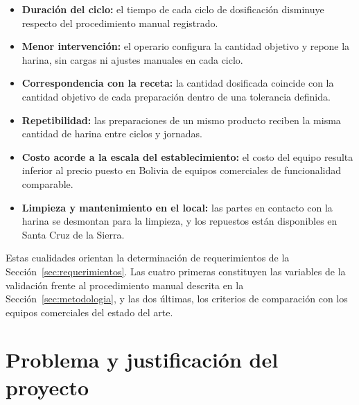 \begin{itemize}
    \item \textbf{Duración del ciclo:} el tiempo de cada ciclo de
    dosificación disminuye respecto del procedimiento manual registrado.
    \item \textbf{Menor intervención:} el operario configura la cantidad
    objetivo y repone la harina, sin cargas ni ajustes manuales en cada
    ciclo.
    \item \textbf{Correspondencia con la receta:} la cantidad dosificada
    coincide con la cantidad objetivo de cada preparación dentro de una
    tolerancia definida.
    \item \textbf{Repetibilidad:} las preparaciones de un mismo producto
    reciben la misma cantidad de harina entre ciclos y jornadas.
    \item \textbf{Costo acorde a la escala del establecimiento:} el costo del
    equipo resulta inferior al precio puesto en Bolivia de equipos
    comerciales de funcionalidad comparable.
    \item \textbf{Limpieza y mantenimiento en el local:} las partes en
    contacto con la harina se desmontan para la limpieza, y los repuestos
    están disponibles en Santa Cruz de la Sierra.
\end{itemize}

Estas cualidades orientan la determinación de requerimientos de la
Sección~\ref{sec:requerimientos}. Las cuatro primeras constituyen las
variables de la validación frente al procedimiento manual descrita en la
Sección~\ref{sec:metodologia}, y las dos últimas, los criterios de
comparación con los equipos comerciales del estado del arte.


\section{Problema y justificación del proyecto}
\label{sec:problema}


